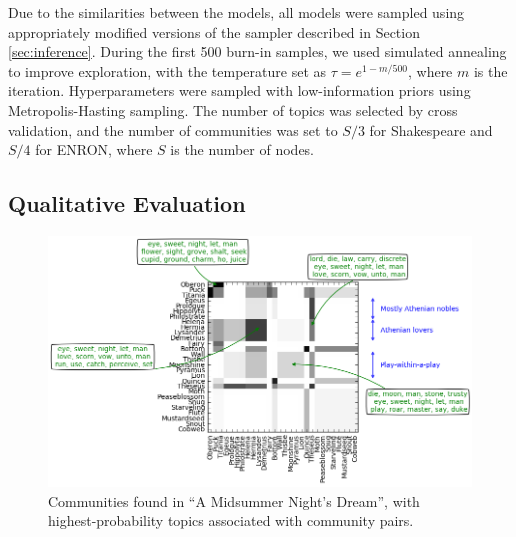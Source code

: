        Due to the similarities between the models, all models were sampled using appropriately modified versions of the sampler described in Section \ref{sec:inference}. During the first 500 burn-in samples, we used simulated annealing to improve exploration, with the temperature set as $\tau = e^{1 - m/500}$, where  $m$ is the iteration. Hyperparameters were sampled with low-information priors using Metropolis-Hasting sampling. The number of topics was selected by cross validation, and the number of communities was set to $S/3$ for Shakespeare and $S/4$ for ENRON, where $S$ is the number of nodes. 
    
    \subsection{Qualitative Evaluation}\label{sec:qual}

        \begin{figure}[p]
          \begin{center}
          \includegraphics[width=\textwidth]{fig_networktopic/SparseShakeClusters.png}
          \caption{Communities found in ``A  Midsummer Night's Dream'', with highest-probability topics associated with community pairs.}
          \label{fig:shake_topics}
          \end{center}
        \end{figure}
        
